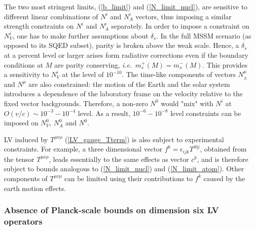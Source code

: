 \documentclass[12pt]{revtex4}
\begin{document}
The two most stringent limits, (\ref{b_limit}) and (\ref{N_limit_nucl}),
are sensitive to different linear combinations of $N^i$ and $N_A^i$ vectors,
thus imposing a similar strength constraints on $N^i$ and $N_A^i$
separately. In order to impose a constraint on $N_V^i$, one has to  
make further assumptions about $\delta_s$. In the full MSSM scenario
(as opposed to its SQED subset), parity is broken above the weak
scale. 
Hence,  a $\delta_s $ at a percent level or larger
arises form radiative corrections even if the boundary conditions at
$M$ are parity conserving, {\em i.e.}\ $m_s^+(M) = m_s^-(M)$. 
This provides a sensitivity to $N_V^i$ at the level of $10^{-10}$. 
The time-like components of vectors $N_\pm^\mu$ and $N^\mu $ are 
also constrained:  
the motion of the Earth and the solar system introduces a dependence
of the laboratory frame  on the velocity relative to the fixed vector
backgrounds. Therefore, a non-zero $N^0$ would "mix" with 
$N^i$ at $O(v/c) \sim 10^{-3}-10^{-4}$ level. As a result, 
$10^{-6}-10^{-8}$ level constraints can be 
imposed on $N_V^0$, $N_A^0$ and $N^0$. 


LV induced by $ T^{\mu\nu\rho} $ (\ref{LV_gauge_Tterm})
is also subject to experimental constraints. For example, 
a three dimensional vector $ f^k=\epsilon_{ijk} T^{i0j}$, 
obtained from the tensor $T^{\mu\nu\rho} $, leads essentially to the
same effects as  vector $c^k$, and is therefore subject to bounds
analogous to (\ref{N_limit_nucl}) and (\ref{N_limit_atom}). Other
components of $ T^{\mu\nu\rho} $ can be limited using   
their contributions to $f^k$ caused by the earth motion effects. 


\subsubsection*{Absence of Planck-scale bounds on dimension six LV operators}
\end{document}
